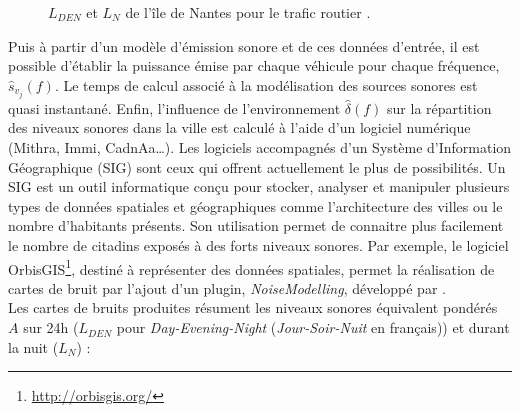 \begin{figure}[t]
\centering
{}
\caption{$L_{DEN}$  et $L_N$  de l'île de Nantes pour le trafic routier \cite{nantes_carte}.}
\label{fig:carto_nantes}
\end{figure}

Puis à partir d'un modèle d'émission sonore et de ces données d'entrée, il est possible d'établir la puissance émise par chaque véhicule pour chaque fréquence, $\hat{s}_{v_j}(f)$. Le temps de calcul associé à la modélisation des sources sonores est quasi instantané.
Enfin, l'influence de l'environnement $\hat{\delta}(f)$ sur la répartition des niveaux sonores dans la ville est calculé à l'aide d'un logiciel numérique (Mithra, Immi, CadnAa\dots). Les logiciels accompagnés d'un Système d'Information Géographique (SIG) sont ceux qui offrent actuellement le plus de possibilités. Un SIG est un outil informatique conçu pour stocker, analyser et manipuler plusieurs types de données spatiales et géographiques comme l'architecture des villes ou le nombre d'habitants présents.
Son utilisation permet de connaitre plus facilement le nombre de citadins exposés à des forts niveaux sonores.
Par exemple, le logiciel OrbisGIS\footnote{\url{http://orbisgis.org/}}, destiné à représenter des données spatiales, permet la réalisation de cartes de bruit par l'ajout d'un plugin, \textit{NoiseModelling}, développé par \cite{fortin}. \\

Les cartes de bruits produites résument les niveaux sonores équivalent pondérés $A$ sur 24h ($L_{DEN}$ pour \textit{Day-Evening-Night} (\textit{Jour-Soir-Nuit} en français)) et durant la nuit ($L_N$) :


